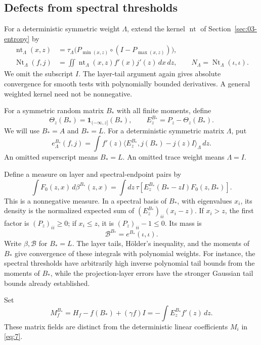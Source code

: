 \subsection{Defects from spectral thresholds}

For a deterministic symmetric weight $\Lambda$, extend the kernel
$\operatorname{nt}$ of Section~\ref{sec:03-entropy} by
\[
 \begin{aligned}
 \operatorname{nt}_\Lambda(x,z)
 &=\tau_\Lambda\bigl(P_{\min(x,z)}\circ(I-P_{\max(x,z)})\bigr),\\
 \operatorname{Nt}_\Lambda(f,j)
 &=\iint\operatorname{nt}_\Lambda(x,z)f'(x)j'(z)\,dx\,dz,
 \qquad N_\Lambda=\operatorname{Nt}_\Lambda(\iota,\iota).
 \end{aligned}
\]
We omit the subscript $I$. The layer-tail argument again gives
absolute convergence for smooth tests with polynomially bounded
derivatives. A general weighted kernel need not be nonnegative.

For a symmetric random matrix \(B_*\) with all finite moments, define
\[
 \Theta_z(B_*)=\mathbf1_{(-\infty,z]}(B_*),\qquad
 E_z^{B_*}=P_z-\Theta_z(B_*).
\]
We will use \(B_*=A\) and \(B_*=L\). For a deterministic symmetric
matrix \(\Lambda\), put
\[
 e_\Lambda^{B_*}(f,j)
  =\int f'(z)
      \langle E_z^{B_*},j(B_*)-j(z)I\rangle_\Lambda\,dz.
\]
An omitted superscript means \(B_*=L\). An omitted trace weight means
\(\Lambda=I\).

Define a measure on layer and spectral-endpoint pairs by
\[
 \int F_0(z,x)\,d\beta^{B_*}(z,x)
   =\int dz\,\tau\!\left[
       E_z^{B_*}(B_*-zI)F_0(z,B_*)\right].
\]
This is a nonnegative measure. In a spectral basis of \(B_*\), with
eigenvalues \(x_i\), its density is the normalized expected sum of
\((E_z^{B_*})_{ii}(x_i-z)\). If \(x_i>z\), the first factor is
\((P_z)_{ii}\geq0\); if \(x_i\leq z\), it is
\((P_z)_{ii}-1\leq0\). Its mass is
\[
 \mathcal B^{B_*}=e^{B_*}(\iota,\iota).
\]
Write \(\beta,\mathcal B\) for \(B_*=L\).
The layer tails, H\"older's inequality, and the moments of \(B_*\)
give convergence of these integrals with polynomial weights.
For instance, the spectral thresholds have arbitrarily high inverse
polynomial tail bounds from the moments of \(B_*\), while the
projection-layer errors have the stronger Gaussian tail bounds
already established.

Set
\[
 M_f^{B_*}
    =H_f-f(B_*)+(\gamma f)I
    =-\int E_z^{B_*}f'(z)\,dz.
\]
These matrix fields are distinct from the deterministic linear
coefficients \(M_i\) in \eqref{eq:7}.

